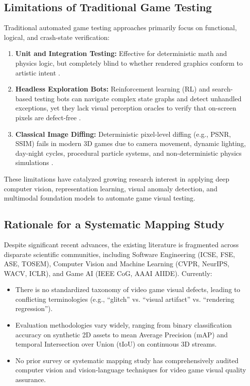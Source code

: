 \documentclass[preprint,12pt,3p]{elsarticle}
\begin{document}
\subsection{Limitations of Traditional Game Testing}
Traditional automated game testing approaches primarily focus on functional, logical, and crash-state verification:
\begin{enumerate}
    \item \textbf{Unit and Integration Testing:} Effective for deterministic math and physics logic, but completely blind to whether rendered graphics conform to artistic intent \cite{politowski2021survey}.
    \item \textbf{Headless Exploration Bots:} Reinforcement learning (RL) and search-based testing bots can navigate complex state graphs and detect unhandled exceptions, yet they lack visual perception oracles to verify that on-screen pixels are defect-free \cite{bergdahl2020automating, zheng2021wuji}.
    \item \textbf{Classical Image Diffing:} Deterministic pixel-level diffing (e.g., PSNR, SSIM) fails in modern 3D games due to camera movement, dynamic lighting, day-night cycles, procedural particle systems, and non-deterministic physics simulations \cite{macklon2022html5bugs, mahajan2021effective}.
\end{enumerate}
These limitations have catalyzed growing research interest in applying deep computer vision, representation learning, visual anomaly detection, and multimodal foundation models to automate game visual testing.

\subsection{Rationale for a Systematic Mapping Study}
Despite significant recent advances, the existing literature is fragmented across disparate scientific communities, including Software Engineering (ICSE, FSE, ASE, TOSEM), Computer Vision and Machine Learning (CVPR, NeurIPS, WACV, ICLR), and Game AI (IEEE CoG, AAAI AIIDE). Currently:
\begin{itemize}
    \item There is no standardized taxonomy of video game visual defects, leading to conflicting terminologies (e.g., ``glitch'' vs. ``visual artifact'' vs. ``rendering regression'').
    \item Evaluation methodologies vary widely, ranging from binary classification accuracy on synthetic 2D assets to mean Average Precision (mAP) and temporal Intersection over Union (tIoU) on continuous 3D streams.
    \item No prior survey or systematic mapping study has comprehensively audited computer vision and vision-language techniques for video game visual quality assurance.
\end{itemize}
\end{document}
